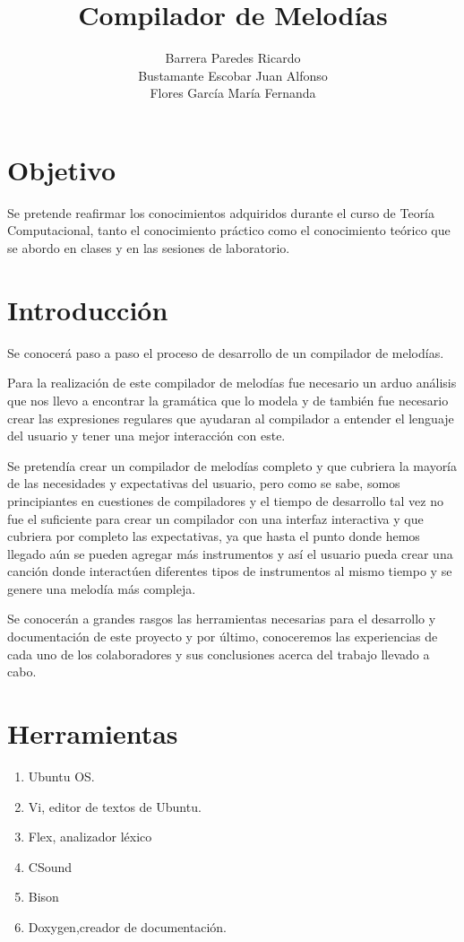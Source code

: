 \documentclass[12pt]{article}
\title{\textbf{Compilador de Melodías}}
\author{Barrera Paredes Ricardo\\
Bustamante Escobar Juan Alfonso\\
Flores García María Fernanda\\
  	}
\date{}
\begin{document}
\maketitle

\section{Objetivo}

Se pretende reafirmar los conocimientos adquiridos durante el curso de Teoría Computacional, tanto el conocimiento práctico como el conocimiento teórico que se abordo en clases y en las sesiones de laboratorio.

\section{Introducción}

Se conocerá paso a paso el proceso de desarrollo de un compilador de melodías. 

Para la realización de este compilador de melodías fue necesario un arduo análisis que nos llevo a encontrar la gramática que lo modela y de también fue necesario crear las expresiones regulares que ayudaran al compilador a entender el lenguaje del usuario y tener una mejor interacción con este. 

Se pretendía crear un compilador de melodías completo y que cubriera la mayoría de las necesidades y expectativas del usuario, pero como se sabe, somos principiantes en cuestiones de compiladores y el tiempo de desarrollo tal vez no fue el suficiente para crear un compilador con una interfaz interactiva y que cubriera por completo  las expectativas, ya que hasta el punto donde hemos llegado aún se pueden agregar más instrumentos y así el usuario pueda crear una canción donde interactúen diferentes tipos de instrumentos al mismo tiempo y se genere una melodía más compleja.

Se conocerán a grandes rasgos las herramientas necesarias para el desarrollo y documentación de este proyecto y por último, conoceremos las experiencias de cada uno de los colaboradores y sus conclusiones acerca del trabajo llevado a cabo.

\section{Herramientas}

\begin{enumerate}

\item Ubuntu OS.\\
\item Vi, editor de textos de Ubuntu.\\
\item Flex, analizador léxico\\
\item CSound\\
\item Bison\\
\item Doxygen,creador de documentación.\\

\end{enumerate}
\end{document}
